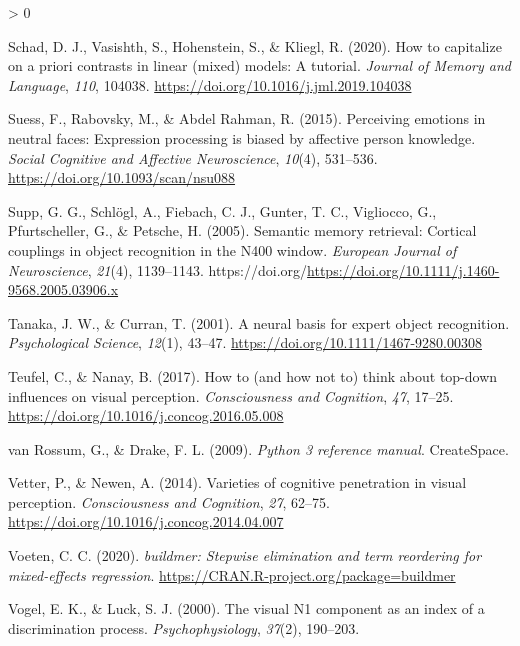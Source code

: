 \documentclass[
  english,
  doc,12pt,twoside,floatsintext]{apa7}
\newlength{\cslhangindent}
\newenvironment{CSLReferences}[2] %
 {%
  \setlength{\parindent}{0pt}
  \ifodd #1 \everypar{\setlength{\hangindent}{\cslhangindent}}\ignorespaces\fi
  \ifnum #2 > 0
  \setlength{\parskip}{#2\baselineskip}
  \fi
 }%
 {}
\begin{document}
\begin{CSLReferences}{1}{0}
\leavevmode\hypertarget{ref-schad2020}{}%
Schad, D. J., Vasishth, S., Hohenstein, S., \& Kliegl, R. (2020). How to capitalize on a priori contrasts in linear (mixed) models: A tutorial. \emph{Journal of Memory and Language}, \emph{110}, 104038. \url{https://doi.org/10.1016/j.jml.2019.104038}

\leavevmode\hypertarget{ref-suess2015}{}%
Suess, F., Rabovsky, M., \& Abdel Rahman, R. (2015). Perceiving emotions in neutral faces: Expression processing is biased by affective person knowledge. \emph{Social Cognitive and Affective Neuroscience}, \emph{10}(4), 531--536. \url{https://doi.org/10.1093/scan/nsu088}

\leavevmode\hypertarget{ref-supp2005}{}%
Supp, G. G., Schlögl, A., Fiebach, C. J., Gunter, T. C., Vigliocco, G., Pfurtscheller, G., \& Petsche, H. (2005). Semantic memory retrieval: Cortical couplings in object recognition in the N400 window. \emph{European Journal of Neuroscience}, \emph{21}(4), 1139--1143. https://doi.org/\url{https://doi.org/10.1111/j.1460-9568.2005.03906.x}

\leavevmode\hypertarget{ref-tanaka2001}{}%
Tanaka, J. W., \& Curran, T. (2001). A neural basis for expert object recognition. \emph{Psychological Science}, \emph{12}(1), 43--47. \url{https://doi.org/10.1111/1467-9280.00308}

\leavevmode\hypertarget{ref-teufel2017}{}%
Teufel, C., \& Nanay, B. (2017). How to (and how not to) think about top-down influences on visual perception. \emph{Consciousness and Cognition}, \emph{47}, 17--25. \url{https://doi.org/10.1016/j.concog.2016.05.008}

\leavevmode\hypertarget{ref-vanrossum2009}{}%
van Rossum, G., \& Drake, F. L. (2009). \emph{Python 3 reference manual}. CreateSpace.

\leavevmode\hypertarget{ref-vetter2014}{}%
Vetter, P., \& Newen, A. (2014). Varieties of cognitive penetration in visual perception. \emph{Consciousness and Cognition}, \emph{27}, 62--75. \url{https://doi.org/10.1016/j.concog.2014.04.007}

\leavevmode\hypertarget{ref-R-buildmer}{}%
Voeten, C. C. (2020). \emph{{buildmer}: Stepwise elimination and term reordering for mixed-effects regression}. \url{https://CRAN.R-project.org/package=buildmer}

\leavevmode\hypertarget{ref-vogel2000}{}%
Vogel, E. K., \& Luck, S. J. (2000). The visual {N1} component as an index of a discrimination process. \emph{Psychophysiology}, \emph{37}(2), 190--203.


\end{CSLReferences}
\end{document}
